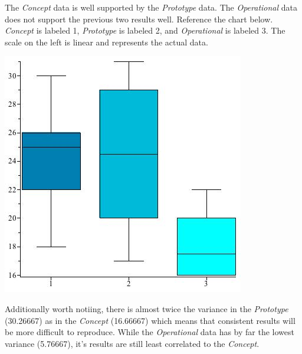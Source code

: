 \documentclass[letterpaper,10pt]{article}
\begin{document}
The \emph{Concept} data is well supported by the \emph{Prototype} data.  The \emph{Operational} data does not support the previous two results well.  Reference the chart below.  \emph{Concept} is labeled 1, \emph{Prototype} is labeled 2, and \emph{Operational} is labeled 3.  The scale on the left is linear and represents the actual data.

\begin{center}
\includegraphics[scale=0.75]{image1.jpg}
\end{center}

Additionally worth notiing, there is almost twice the variance in the \emph{Prototype} (30.26667) as in the \emph{Concept} (16.66667) which means that consistent results will be more difficult to reproduce.  While the \emph{Operational} data has by far the lowest variance (5.76667), it's results are still least correlated to the \emph{Concept}.
\end{document}
